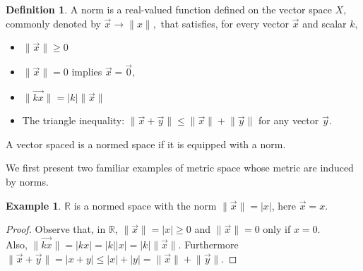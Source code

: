 \documentclass[12pt, reqno]{amsart}
\theoremstyle{definition}
\newtheorem{definition}[theorem]{Definition}
\newtheorem{example}[theorem]{Example}
\numberwithin{equation}{section}
\newcommand{\dR}{{\mathbb R}}
\begin{document}
    \begin{definition}
      A norm is a real-valued function defined on the vector space $X,$ commonly denoted by $\vec{x}\to \|x\|,$
     that satisfies, for every vector $\vec{x}$ and scalar $k,$
     \begin{itemize}
         \item  $\|\vec{x}\| \geq 0$  
         \item $\|\vec{x}\|=0$ implies $\vec{x}=\vec{0}, $ 
         \item  $\|\vec{k x}\|=|k|\|\vec{ x}\|$ 
         \item  The triangle inequality: $\lVert \vec{x} + \vec{y} \rVert \leq \lVert \vec{x} \rVert+\lVert \vec{y} \rVert $ for any vector $\vec{y}.$
     \end{itemize}
     A vector spaced is a normed space if it is equipped with a norm.
    \end{definition} 
     We first present two familiar examples of metric space whose metric are induced by norms.
     \begin{example}\label{normed vec}
     $\dR$ is a normed space with the norm ${ \lVert \vec{x} \rVert }=|x|$, here $\vec{x}=x$.
     \end{example}
     \begin{proof}
     Observe that, in $\dR$, $\lVert \vec{x} \rVert = |x|\geq 0$ and $\lVert \vec{x} \rVert=0$ only if $x=0$.\\
     Also, $\lVert \vec{kx} \rVert = |kx|=|k||x|=|k|\lVert \vec{x} \rVert.$ Furthermore
     $\lVert \vec{x} + \vec{y} \rVert = |x+y|\leq|x|+|y|=\lVert \vec{x} \rVert+\lVert \vec{y} \rVert.$\end{proof}
\end{document}
